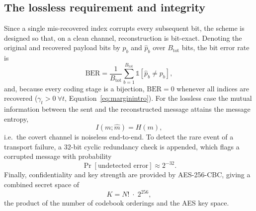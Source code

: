 \documentclass[11pt]{article}
\theoremstyle{definition}
\newcommand{\Eqn}[1]{Equation~\eqref{#1}}
\begin{document}
\subsection{The lossless requirement and integrity}\label{sec:lossless}
Since a single mis-recovered index corrupts every subsequent bit, the scheme is
designed so that, on a clean channel, reconstruction is bit-exact. Denoting the
original and recovered payload bits by $p_b$ and $\hat p_b$ over $B_{\text{tot}}$
bits, the bit error rate is
\begin{equation}
  \mathrm{BER}=\frac{1}{B_{\text{tot}}}\sum_{b=1}^{B_{\text{tot}}}
        \mathbb{1}\!\left[\hat p_b\neq p_b\right],
  \label{eq:berintro}
\end{equation}
and, because every coding stage is a bijection, $\mathrm{BER}=0$ whenever all
indices are recovered ($\gamma_t>0\ \forall t$, \Eqn{eq:marginintro}). For the
lossless case the mutual information between the sent and the reconstructed
message attains the message entropy,
\begin{equation}
  I(m;\hat m)=H(m),
  \label{eq:mutual}
\end{equation}
i.e.\ the covert channel is noiseless end-to-end. To detect the rare event of a
transport failure, a $32$-bit cyclic redundancy check is appended, which flags a
corrupted message with probability
\begin{equation}
  \Pr[\text{undetected error}]\approx 2^{-32}.
  \label{eq:crc}
\end{equation}
Finally, confidentiality and key strength are provided by AES-256-CBC, giving a
combined secret space of
\begin{equation}
  K = N!\;\cdot\;2^{256},
  \label{eq:keyspaceintro}
\end{equation}
the product of the number of codebook orderings and the AES key space.
\end{document}
